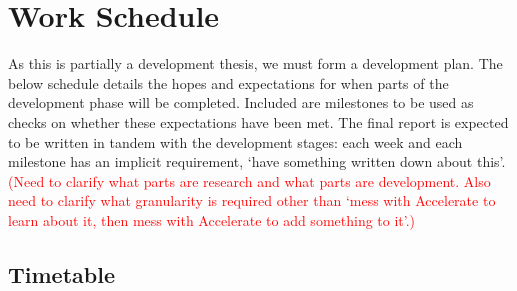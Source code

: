 \documentclass[a4paper,12pt]{article}
\newcommand{\red}[1]{\textcolor{red}{#1}}
\begin{document}
\section{Work Schedule}
\label{sec:Work_Schedule}
As this is partially a development thesis, we must form a development plan.
The below schedule details the hopes and expectations for when parts of the development phase will be completed.
Included are milestones to be used as checks on whether these expectations have been met.
The final report is expected to be written in tandem with the development stages: each week and each milestone has an implicit requirement, `have something written down about this'.
\red{(Need to clarify what parts are research and what parts are development. Also need to clarify what granularity is required other than `mess with Accelerate to learn about it, then mess with Accelerate to add something to it'.)}

\subsection{Timetable}
\end{document}

